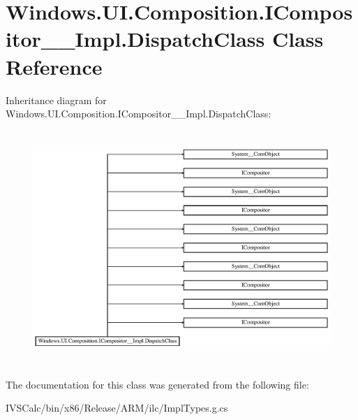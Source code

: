 \hypertarget{class_windows_1_1_u_i_1_1_composition_1_1_i_compositor_____impl_1_1_dispatch_class}{}\section{Windows.\+U\+I.\+Composition.\+I\+Compositor\+\_\+\+\_\+\+Impl.\+Dispatch\+Class Class Reference}
\label{class_windows_1_1_u_i_1_1_composition_1_1_i_compositor_____impl_1_1_dispatch_class}
Inheritance diagram for Windows.\+U\+I.\+Composition.\+I\+Compositor\+\_\+\+\_\+\+Impl.\+Dispatch\+Class\+:\begin{figure}[H]
\begin{center}
\leavevmode
\includegraphics[height=8.876081cm]{class_windows_1_1_u_i_1_1_composition_1_1_i_compositor_____impl_1_1_dispatch_class}
\end{center}
\end{figure}


The documentation for this class was generated from the following file\+:\begin{DoxyCompactItemize}
\item 
I\+V\+S\+Calc/bin/x86/\+Release/\+A\+R\+M/ilc/Impl\+Types.\+g.\+cs\end{DoxyCompactItemize}
